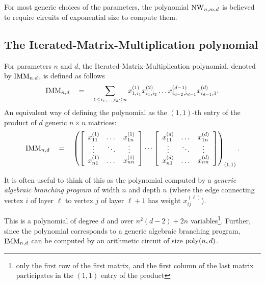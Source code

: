 For most generic choices of the parameters, the polynomial $\mathrm{NW}_{n,m,d}$ is believed to require circuits of exponential size to compute them. 

\subsection*{The Iterated-Matrix-Multiplication polynomial}

For parameters $n$ and $d$, the Iterated-Matrix-Multiplication polynomial, denoted by $\mathrm{IMM}_{n,d}$, is defined as follows
$$
\mathrm{IMM}_{n,d} \quad = \quad \sum_{1\leq i_1,\dots, i_d\leq n} x_{1,i_1}^{(1)}x_{i_1,i_2}^{(2)}\dots x_{i_{d-2},i_{d-1}}^{(d-1)}x_{i_{d-1},1}^{(d)}.
$$
An equivalent way of defining the polynomial as the $(1,1)$-th entry of the product of $d$ generic $n\times n$ matrices:
$$
\mathrm{IMM}_{n,d} \quad = \quad \left(\left[\begin{array}{ccc} x_{11}^{(1)} & \dots & x_{1n}^{(1)}\\ \vdots & \ddots & \vdots \\ x_{n1}^{(1)} & \dots & x_{nn}^{(1)}\end{array}\right] \cdots \left[\begin{array}{ccc} x_{11}^{(d)} & \dots & x_{1n}^{(d)}\\ \vdots & \ddots & \vdots \\ x_{n1}^{(d)} & \dots & x_{nn}^{(d)}\end{array}\right]\right)_{(1,1)}.
$$

It is often useful to think of this as the polynomial computed by a \emph{generic algebraic branching program} of width $n$ and depth $n$ (where the edge connecting vertex $i$ of layer $\ell$ to vertex $j$ of layer $\ell+1$ has weight $x_{ij}^{(\ell)}$). 

This is a polynomial of degree $d$ and over $n^2(d-2) + 2n$ variables\footnote{only the first row of the first matrix, and the first column of the last matrix participates in the $(1,1)$ entry of the product}. Further, since the polynomial corresponds to a generic algebraic branching program, $\mathrm{IMM}_{n,d}$ can be computed by an arithmetic circuit of size $\mathrm{poly}(n,d)$. 


